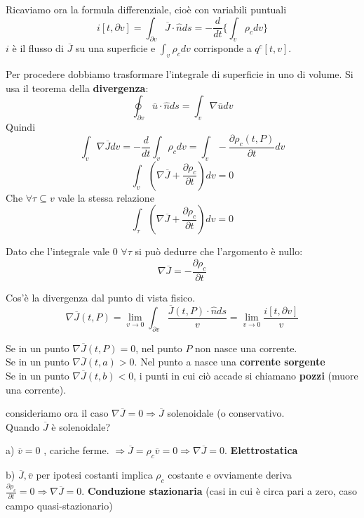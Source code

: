     Ricaviamo ora la formula differenziale, cioè con variabili puntuali
    \[
        i[t,\partial v] = \int_{\partial v}\overline{J}\cdot\hat{n}ds = -\frac{d}{dt}\{\int_v \rho_cdv\}
    \]
    $i$ è il flusso di $\overline{J}$ su una superficie  e $\int_v \rho_c dv$ corrisponde a $q^c[t,v]$.

    Per procedere dobbiamo trasformare l'integrale di superficie in uno di volume. Si usa il teorema della \textbf{divergenza}:
    \[
        \oint_{\partial v}\overline{u}\cdot\hat{n}ds = \int_v \nabla \overline{u}dv
    \]
    Quindi
    \[
        \int_v \nabla \overline{J}dv = -\frac{d}{dt}\int_v \rho_cdv = \int_v - \frac{\partial \rho_c(t,P)}{\partial t} dv
    \]
    \[
        \int_v (\nabla \overline{J} + \frac{\partial \rho_c}{\partial t})dv = 0
    \]
    Che  $\forall\tau \subseteq v$ vale la stessa relazione
    \[
        \int_\tau (\nabla \overline{J} + \frac{\partial \rho_c}{\partial t})dv = 0
    \]

    Dato che l'integrale vale 0 $\forall \tau$ si può dedurre che l'argomento è nullo:
    \[
     \nabla \overline{J} = -\frac{\partial \rho_c}{\partial t}
    \]

    Cos'è la divergenza dal punto di vista fisico.
    \[
    \nabla \overline{J}(t, P) = \lim_{v \to 0} \int_{\partial v}\frac{ \overline{J}(t, P) \cdot \hat{n}ds}{v} = \lim_{v \to 0} \frac{i[t,\partial v]}{v}
    \]

Se in un punto $\nabla \overline{J}(t, P) = 0$, nel punto $P$ non nasce una corrente.\\

Se in un punto $\nabla \overline{J}(t, a) > 0$. Nel punto a nasce una \textbf{corrente sorgente}\\

Se in un punto $\nabla\overline{J}(t, b) < 0$, i punti in cui ciò accade si chiamano \textbf{pozzi} (muore una corrente).

consideriamo ora il caso $\nabla\overline{J} = 0 \Rightarrow \overline{J}$ solenoidale (o conservativo.\\
Quando $\overline{J}$ è solenoidale?

a) $\overline{v}= 0$ , cariche ferme. $\Rightarrow \overline{J} = \rho_c\overline{v} = 0 \Rightarrow \nabla \overline{J} = 0$. \textbf{Elettrostatica}

b) $\overline{J}, \overline{v}$ per ipotesi costanti implica $\rho_c$ costante e ovviamente deriva $\frac{\partial \rho_c}{\partial t} = 0 \Rightarrow \nabla\overline{J} = 0$. \textbf{Conduzione stazionaria} (casi in cui è circa pari a zero, caso campo quasi-stazionario)

